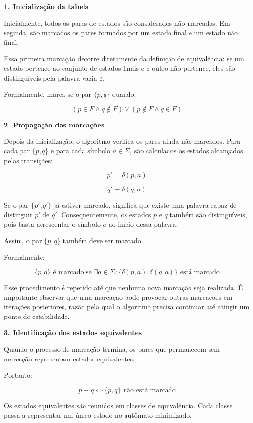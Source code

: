 \documentclass[
  brazilian,
  letterpaper,
]{book}
\theoremstyle{plain}
\theoremstyle{definition}
\theoremstyle{remark}
\begin{document}
\textbf{1. Inicialização da tabela}

Inicialmente, todos os pares de estados são considerados não marcados.
Em seguida, são marcados os pares formados por um estado final e um
estado não final.

Essa primeira marcação decorre diretamente da definição de equivalência:
se um estado pertence ao conjunto de estados finais e o outro não
pertence, eles são distinguíveis pela palavra vazia \(\varepsilon\).

Formalmente, marca-se o par \(\{p,q\}\) quando:

\[
(p \in F \land q \notin F) \lor
(p \notin F \land q \in F)
\]

\textbf{2. Propagação das marcações}

Depois da inicialização, o algoritmo verifica os pares ainda não
marcados. Para cada par \(\{p,q\}\) e para cada símbolo
\(a \in \Sigma\), são calculados os estados alcançados pelas transições:

\[
p' = \delta(p,a)
\]

\[
q' = \delta(q,a)
\]

Se o par \(\{p',q'\}\) já estiver marcado, significa que existe uma
palavra capaz de distinguir \(p'\) de \(q'\). Consequentemente, os
estados \(p\) e \(q\) também são distinguíveis, pois basta acrescentar o
símbolo \(a\) ao início dessa palavra.

Assim, o par \(\{p,q\}\) também deve ser marcado.

Formalmente:

\[
\{p,q\} \text{ é marcado se }
\exists a \in \Sigma:
\{\delta(p,a),\delta(q,a)\}
\text{ está marcado}
\]

Esse procedimento é repetido até que nenhuma nova marcação seja
realizada. É importante observar que uma marcação pode provocar outras
marcações em iterações posteriores, razão pela qual o algoritmo precisa
continuar até atingir um ponto de estabilidade.

\textbf{3. Identificação dos estados equivalentes}

Quando o processo de marcação termina, os pares que permanecem sem
marcação representam estados equivalentes.

Portanto:

\[
p \equiv q \iff \{p,q\} \text{ não está marcado}
\]

Os estados equivalentes são reunidos em classes de equivalência. Cada
classe passa a representar um único estado no autômato minimizado.
\end{document}
